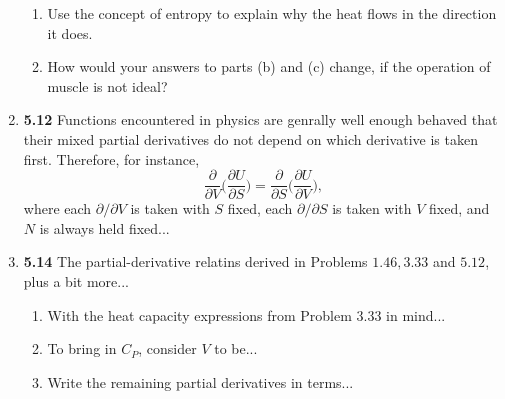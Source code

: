 \documentclass[fleqn]{article}
\begin{document}
\begin{enumerate}
\begin{enumerate}

      \item Use the concept of entropy to explain why the heat flows in the direction it does.


      \item How would your answers to parts (b) and (c) change, if the operation of muscle is not ideal?


    \end{enumerate}

    \item \textbf{5.12} Functions encountered in physics are genrally well enough behaved that their mixed partial 
    derivatives do not depend on which derivative is taken first. Therefore, for instance,
    $$
      \dfrac{\partial}{\partial V} \bigg( \dfrac{\partial U}{\partial S} \bigg)=\dfrac{\partial}{\partial S} \bigg( \dfrac{\partial U}{\partial V} \bigg),
    $$
    where each $\partial/\partial V$ is taken with $S$ fixed, each $\partial/\partial S$ is taken with $V$ fixed, and 
    $N$ is always held fixed...



    \item \textbf{5.14} The partial-derivative relatins derived in Problems $1.46, 3.33$ and $5.12$, plus a bit more...
    \begin{enumerate}
      \item With the heat capacity expressions from Problem $3.33$ in mind...


      \item To bring in $C_P$, consider $V$ to be...


      \item Write the remaining partial derivatives in terms...



\end{enumerate}
\end{enumerate}
\end{document}
